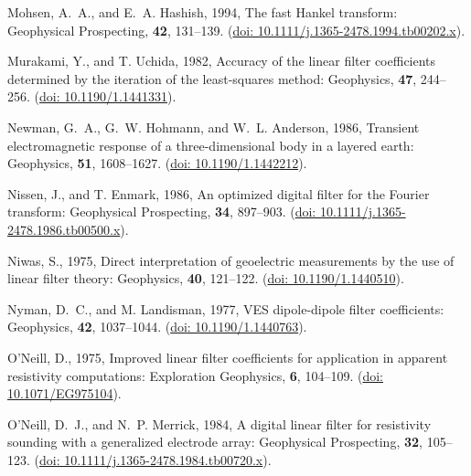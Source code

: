 \documentclass[paper,twocolumn,twoside]{geophysics}
\begin{document}
\begin{thebibliography}{}
Mohsen, A.~A., and E.~A. Hashish,  1994, The fast {H}ankel transform:
  Geophysical Prospecting, {\bf 42}, 131--139.
\newblock (\href{http://doi.org/10.1111/j.1365-2478.1994.tb00202.x}{doi:
  10.1111/j.1365-2478.1994.tb00202.x}).

Murakami, Y., and T. Uchida,  1982, Accuracy of the linear filter coefficients
  determined by the iteration of the least-squares method: Geophysics, {\bf
  47}, 244--256.
\newblock (\href{https://doi.org/10.1190/1.1441331}{doi: 10.1190/1.1441331}).

Newman, G.~A., G.~W. Hohmann, and W.~L. Anderson,  1986, Transient
  electromagnetic response of a three-dimensional body in a layered earth:
  Geophysics, {\bf 51}, 1608--1627.
\newblock (\href{http://doi.org/10.1190/1.1442212}{doi: 10.1190/1.1442212}).

Nissen, J., and T. Enmark,  1986, An optimized digital filter for the {F}ourier
  transform: Geophysical Prospecting, {\bf 34}, 897--903.
\newblock (\href{http://doi.org/10.1111/j.1365-2478.1986.tb00500.x}{doi:
  10.1111/j.1365-2478.1986.tb00500.x}).

Niwas, S.,  1975, Direct interpretation of geoelectric measurements by the use
  of linear filter theory: Geophysics, {\bf 40}, 121--122.
\newblock (\href{https://doi.org/10.1190/1.1440510}{doi: 10.1190/1.1440510}).

Nyman, D.~C., and M. Landisman,  1977, {VES} dipole-dipole filter coefficients:
  Geophysics, {\bf 42}, 1037--1044.
\newblock (\href{https://doi.org/10.1190/1.1440763}{doi: 10.1190/1.1440763}).

O'Neill, D.,  1975, Improved linear filter coefficients for application in
  apparent resistivity computations: Exploration Geophysics, {\bf 6}, 104--109.
\newblock (\href{http://library.seg.org/doi/abs/10.1071/EG975104}{doi:
  10.1071/EG975104}).

O'Neill, D.~J., and N.~P. Merrick,  1984, A digital linear filter for
  resistivity sounding with a generalized electrode array: Geophysical
  Prospecting, {\bf 32}, 105--123.
\newblock (\href{http://doi.org/10.1111/j.1365-2478.1984.tb00720.x}{doi:
  10.1111/j.1365-2478.1984.tb00720.x}).


\end{thebibliography}
\end{document}
